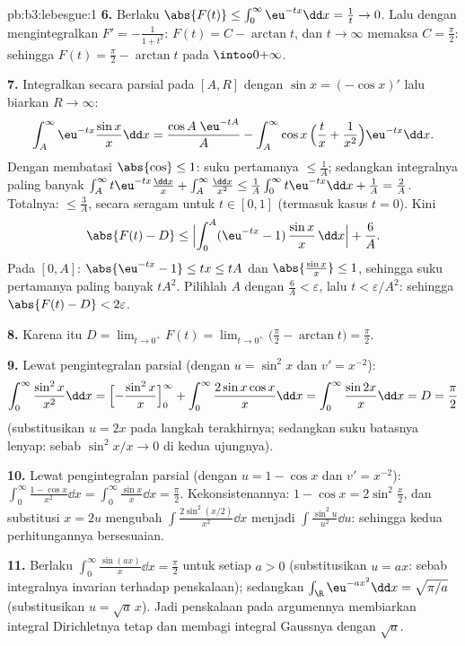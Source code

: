 \begin{solution}{pb:b3:lebesgue:1}
\textbf{6.} Berlaku $\abs{F(t)} \leq \int_0^\infty\eu^{-tx}\dd x =
\frac1t \to 0$. Lalu dengan mengintegralkan $F' = -\frac1{1+t^2}$: $F(t) = C -
\arctan t$, dan $t \to \infty$ memaksa $C = \frac\pi2$: sehingga $F(t) =
\frac\pi2 - \arctan t$ pada $\intoo0{+\infty}$.

\textbf{7.} Integralkan secara parsial pada $[A, R]$ dengan $\sin x =
(-\cos x)'$ lalu biarkan $R \to \infty$:
\[
\int_A^{\infty}\eu^{-tx}\frac{\sin x}x\dd x
= \frac{\cos A\;\eu^{-tA}}{A}
- \int_A^\infty \cos x\,\Bigl(\frac tx +
\frac1{x^2}\Bigr)\eu^{-tx}\dd x .
\]
Dengan membatasi $\abs{\cos} \leq 1$: suku pertamanya $\leq \frac1A$;
sedangkan integralnya paling banyak $\int_A^\infty t\eu^{-tx}\frac{\dd x}x
+ \int_A^\infty\frac{\dd x}{x^2} \leq \frac1A\int_0^\infty
t\eu^{-tx}\dd x + \frac1A = \frac2A$. Totalnya: $\leq \frac 3A$,
secara seragam untuk $t \in [0, 1]$ (termasuk kasus $t = 0$). Kini
\[
\abs{F(t) - D} \leq
\Bigl|\int_0^A(\eu^{-tx} - 1)\,\frac{\sin x}x\,\dd x\Bigr| +
\frac6A .
\]
Pada $[0, A]$: $\abs{\eu^{-tx} - 1} \leq tx \leq tA$ dan
$\abs{\frac{\sin x}x} \leq 1$, sehingga suku pertamanya paling banyak
$tA^2$. Pilihlah $A$ dengan $\frac6A < \varepsilon$, lalu $t <
\varepsilon/A^2$: sehingga $\abs{F(t) - D} < 2\varepsilon$.

\textbf{8.} Karena itu $D = \lim_{t\to0^+}F(t) =
\lim_{t\to0^+}\bigl(\frac\pi2 - \arctan t\bigr) =
\frac\pi2$.

\textbf{9.} Lewat pengintegralan parsial (dengan $u = \sin^2x$ dan $v' = x^{-2}$):
\[
\int_0^\infty\frac{\sin^2x}{x^2}\dd x
= \Bigl[-\frac{\sin^2x}{x}\Bigr]_0^\infty +
\int_0^\infty\frac{2\sin x\cos x}{x}\dd x
= \int_0^\infty\frac{\sin 2x}{x}\dd x = D = \frac\pi2
\]
(substitusikan $u = 2x$ pada langkah terakhirnya; sedangkan suku batasnya lenyap:
sebab $\sin^2 x/x \to 0$ di kedua ujungnya).

\textbf{10.} Lewat pengintegralan parsial (dengan $u = 1 - \cos x$ dan $v' = x^{-2}$):
$\int_0^\infty\frac{1 - \cos x}{x^2}\dd x =
\int_0^\infty\frac{\sin x}x\dd x = \frac\pi2$. Kekonsistenannya:
$1 - \cos x = 2\sin^2\frac x2$, dan substitusi $x = 2u$
mengubah $\int\frac{2\sin^2(x/2)}{x^2}\dd x$ menjadi
$\int\frac{\sin^2u}{u^2}\dd u$: sehingga kedua perhitungannya bersesuaian.

\textbf{11.} Berlaku $\int_0^\infty\frac{\sin(ax)}x\dd x = \frac\pi2$
untuk setiap $a > 0$ (substitusikan $u = ax$: sebab integralnya
invarian terhadap penskalaan); sedangkan $\int_\R\eu^{-ax^2}\dd x = \sqrt{\pi/a}$
(substitusikan $u = \sqrt a\,x$). Jadi penskalaan pada argumennya membiarkan
integral Dirichletnya tetap dan membagi integral Gaussnya dengan
$\sqrt a$.


\end{solution}
